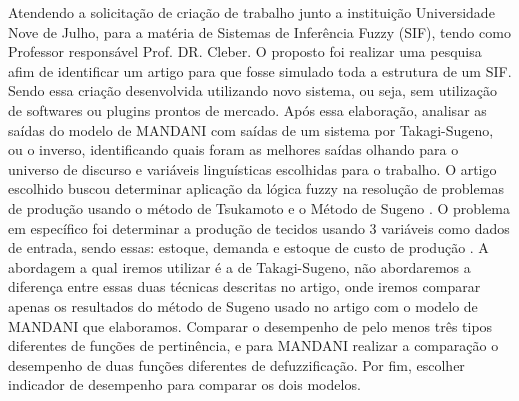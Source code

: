 \documentclass[courier]{uninove-ppgi}
\begin{document}
    
        
    
    
    
        \capa
        
        
        
        \folharosto
    
    		   
    
    
    \begin{resumo}
    
        Atendendo a solicitação de criação de trabalho junto a instituição Universidade Nove de Julho, para a matéria de Sistemas de Inferência Fuzzy (SIF),
        tendo como Professor responsável Prof. DR. Cleber. O proposto foi realizar uma pesquisa afim de identificar um artigo para que fosse simulado toda a estrutura de um SIF. 
        Sendo essa criação desenvolvida utilizando novo sistema, ou seja, sem utilização de softwares ou plugins prontos de mercado. Após essa elaboração, analisar
        as saídas do modelo de MANDANI com saídas de um sistema por Takagi-Sugeno, ou o inverso, identificando quais foram as melhores saídas olhando para o universo de 
        discurso e variáveis linguísticas escolhidas para o trabalho. O artigo escolhido buscou determinar aplicação da lógica fuzzy na resolução de problemas de produção usando o método de Tsukamoto e o Método de Sugeno .
		O problema em específico foi determinar a produção de tecidos usando 3 variáveis como dados de entrada, sendo essas: estoque, demanda e estoque de custo de produção .
		A abordagem a qual iremos utilizar é a de Takagi-Sugeno, não abordaremos a diferença entre essas duas técnicas descritas no artigo, onde iremos comparar apenas os resultados do método de Sugeno usado no artigo
		com o modelo de MANDANI que elaboramos. Comparar o desempenho de pelo menos três tipos diferentes de funções de pertinência, e para MANDANI realizar a comparação o desempenho de duas
		funções diferentes de defuzzificação. Por fim, escolher indicador de desempenho para comparar os dois modelos.
    
    \end{resumo}
    
\end{document}
